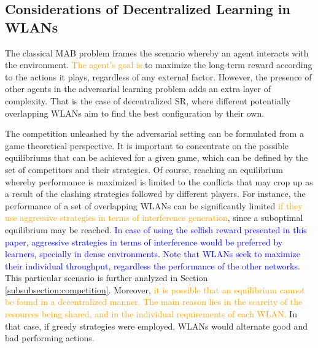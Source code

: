 \documentclass[preprint,12pt]{elsarticle}
\begin{document}
\subsection{Considerations of Decentralized Learning in WLANs}
\label{subsection:considerations}
The classical MAB problem frames the scenario whereby an agent interacts with the environment. \textcolor{orange}{The agent's goal is} to maximize the long-term reward according to the actions it plays, regardless of any external factor. However, the presence of other agents in the adversarial learning problem adds an extra layer of complexity. That is the case of decentralized SR, where different potentially overlapping WLANs aim to find the best configuration by their own. 

The competition unleashed by the adversarial setting can be formulated from a game theoretical perspective. It is important to concentrate on the possible equilibriums that can be achieved for a given game, which can be defined by the set of competitors and their strategies. Of course, reaching an equilibrium whereby performance is maximized is limited to the conflicts that may crop up as a result of the clashing strategies followed by different players. For instance, the performance of a set of overlapping WLANs can be significantly limited \textcolor{orange}{if they use aggressive strategies in terms of interference generation}, since a suboptimal equilibrium may be reached. \textcolor{blue}{In case of using the selfish reward presented in this paper, aggressive strategies in terms of interference would be preferred by learners, specially in dense environments. Note that WLANs seek to maximize their individual throughput, regardless the performance of the other networks.} This particular scenario is further analyzed in Section \ref{subsubsection:competition}. Moreover, \textcolor{orange}{it is possible that an equilibrium cannot be found in a decentralized manner. The main reason lies in the scarcity of the resources being shared, and in the individual requirements of each WLAN.} In that case, if greedy strategies were employed, WLANs would alternate good and bad performing actions. 
	
\end{document}
